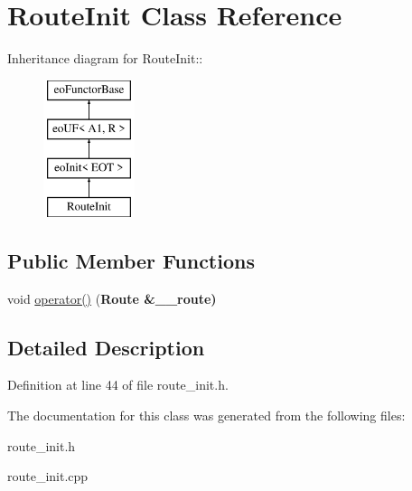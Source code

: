 \hypertarget{classRouteInit}{
\section{Route\-Init Class Reference}
\label{classRouteInit}
}
Inheritance diagram for Route\-Init::\begin{figure}[H]
\begin{center}
\leavevmode
\includegraphics[height=4cm]{classRouteInit}
\end{center}
\end{figure}
\subsection*{Public Member Functions}
\begin{CompactItemize}
\item 
\hypertarget{classRouteInit_b65a7137e114458faadb6a5510c001f7}{
void \hyperlink{classRouteInit_b65a7137e114458faadb6a5510c001f7}{operator()} (\bf{Route} \&\_\-\_\-route)}
\label{classRouteInit_b65a7137e114458faadb6a5510c001f7}

\end{CompactItemize}


\subsection{Detailed Description}




Definition at line 44 of file route\_\-init.h.

The documentation for this class was generated from the following files:\begin{CompactItemize}
\item 
route\_\-init.h\item 
route\_\-init.cpp\end{CompactItemize}

